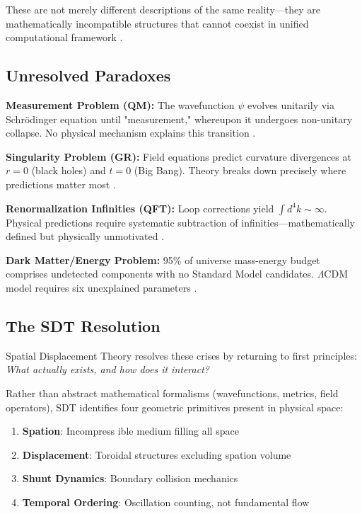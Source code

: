 These are not merely different descriptions of the same reality—they are mathematically incompatible structures that cannot coexist in unified computational framework \cite{carlip2001quantum, isham1995structural}.

\subsection{Unresolved Paradoxes}

\textbf{Measurement Problem (QM):} The wavefunction $\psi$ evolves unitarily via Schrödinger equation until "measurement," whereupon it undergoes non-unitary collapse. No physical mechanism explains this transition \cite{bell1987speakable, ghirardi1986unified}.

\textbf{Singularity Problem (GR):} Field equations predict curvature divergences at $r=0$ (black holes) and $t=0$ (Big Bang). Theory breaks down precisely where predictions matter most \cite{hawking1973large, penrose1965gravitational}.

\textbf{Renormalization Infinities (QFT):} Loop corrections yield $\int d^4k \sim \infty$. Physical predictions require systematic subtraction of infinities—mathematically defined but physically unmotivated \cite{thooft1972regularization, wilson1974renormalization}.

\textbf{Dark Matter/Energy Problem:} 95\% of universe mass-energy budget comprises undetected components with no Standard Model candidates. $\Lambda$CDM model requires six unexplained parameters \cite{planck2018cosmological, rubin1980rotational}.

\subsection{The SDT Resolution}

Spatial Displacement Theory resolves these crises by returning to first principles: \emph{What actually exists, and how does it interact?}

Rather than abstract mathematical formalisms (wavefunctions, metrics, field operators), SDT identifies four geometric primitives present in physical space:

\begin{enumerate}
\item \textbf{Spation}: Incompress ible medium filling all space
\item \textbf{Displacement}: Toroidal structures excluding spation volume
\item \textbf{Shunt Dynamics}: Boundary collision mechanics
\item \textbf{Temporal Ordering}: Oscillation counting, not fundamental flow
\end{enumerate}


